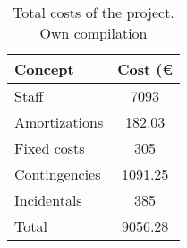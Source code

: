 \begin{table}[htbp!]
\centering
\begin{tabular}{|l|c|}
\hline
Concept       & \multicolumn{1}{l|}{Cost (\euro} \\ \hline
Staff         & 7093                             \\ \hline
Amortizations & 182.03                           \\ \hline
Fixed costs   & 305                              \\ \hline
Contingencies & 1091.25                          \\ \hline
Incidentals   & 385                              \\ \hline
Total         & 9056.28                          \\ \hline
\end{tabular}
\caption[Total costs of the project]{Total costs of the project. Own compilation}
\label{tab:tot}
\end{table}



